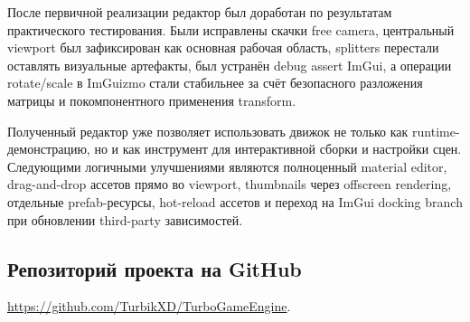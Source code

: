 \documentclass[a4paper,14pt]{extarticle}
\begin{document}
После первичной реализации редактор был доработан по результатам практического тестирования. Были исправлены скачки free camera, центральный viewport был зафиксирован как основная рабочая область, splitters перестали оставлять визуальные артефакты, был устранён debug assert ImGui, а операции rotate/scale в ImGuizmo стали стабильнее за счёт безопасного разложения матрицы и покомпонентного применения transform.

Полученный редактор уже позволяет использовать движок не только как runtime-демонстрацию, но и как инструмент для интерактивной сборки и настройки сцен. Следующими логичными улучшениями являются полноценный material editor, drag-and-drop ассетов прямо во viewport, thumbnails через offscreen rendering, отдельные prefab-ресурсы, hot-reload ассетов и переход на ImGui docking branch при обновлении third-party зависимостей.

\subsection*{Репозиторий проекта на GitHub}
\href{https://github.com/TurbikXD/TurboGameEngine}{https://github.com/TurbikXD/TurboGameEngine}.
\end{document}
